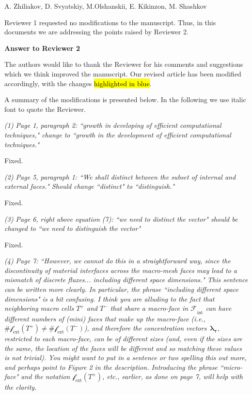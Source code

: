 \documentclass[12pt]{article}
\DeclareRobustCommand{\hlcyan}[1]{{\sethlcolor{cyan}\hl{#1}}}
\newcommand{\vect}[1]{\boldsymbol{\mathbf{#1}}}
\newcommand{\mfaces}[1][]{{\vect{\mathcal f}_{\text{#1}}}}
\newcommand{\bfaces}[1][]{{\vect{\mathcal F}_{\text{#1}}}}
\begin{document}
\centerline{
{\Large {A. Zhiliakov, D. Svyatskiy, M.Olshanskii, E. Kikinzon, M. Shashkov}}}


Reviewer 1 requested no modifications to the manuscript. Thus, in this documents we are  addressing the points raised by Reviewer 2.

\textbf{Answer to Reviewer 2}

The authors would like to thank the Reviewer for his comments and
suggestions which we think improved the manuscript.
Our revised article has been modified accordingly, with the changes \hlcyan{highlighted in blue}.


A summary of the modifications is presented below.  In the following
we use italic font to quote the Reviewer.

\emph{(1) Page 1, paragraph 2: ``growth in developing of efficient computational techniques," change to ``growth in the development of efficient computational techniques."}

Fixed.

\emph{(2) Page 5, paragraph 1: ``We shall distinct between the subset of internal and external faces." Should change ``distinct" to ``distinguish."}

Fixed.

\emph{(3) Page 6, right above equation (7): ``we need to distinct the vector" should be changed to ``we need to distinguish the vector"}

Fixed.

\emph{(4) Page 7: ``However, we cannot do this in a straightforward way, since the discontinuity of material interfaces across the macro-mesh faces may lead to a mismatch of discrete fluxes... including different space dimensions." This sentence can be written more clearly. In particular, the phrase ``including different space dimensions" is a bit confusing. I think you are alluding to the fact that neighboring macro cells $T^{+}$ and $T^{-}$ that share a macro-face in $\bfaces_{\text{int}}$ can have different numbers of (mini) faces that make up the macro-face (i.e., $\#\mfaces[ext](T^+) \neq \#\mfaces[ext](T^-)$), and therefore the concentration vectors~$\vect \lambda_{\boldsymbol{\tau}}$, restricted to each macro-face, can be of different sizes (and, even if the sizes are the same, the location of the faces will be different and so matching these values is not trivial). You might want to put in a sentence or two spelling this out more, and perhaps point to Figure 2 in the description. Introducing the phrase ``micro-face" and the notation $\mfaces[ext](T^+)$, etc., earlier, as done on page 7, will help with the clarity.}
\end{document}
